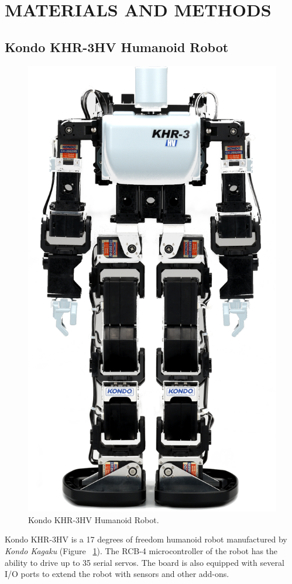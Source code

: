 \documentclass[12pt]{article}
\newcommand\mysection[1]{\vspace*{-0.35cm}\section{#1}\vspace*{6pt}\thispagestyle{empty}}
\newcommand\mysubsection[1]{\subsection{#1}}
\numberwithin{equation}{section}
\numberwithin{figure}{section}
\numberwithin{table}{section}
\begin{document}
\clearpage
\vspace*{-0.35cm}
\mysection{MATERIALS AND METHODS}\label{seq:mat_met}

\mysubsection{Kondo KHR-3HV Humanoid Robot}\label{seq:kondo}
\par{
    \begin{figure}[ht]
        \centering
        \includegraphics[scale=0.7]{images/kondo}
        \caption{Kondo KHR-3HV Humanoid Robot.}
        \label{fig:kondo}
    \end{figure}
    Kondo KHR-3HV is a 17 degrees of freedom humanoid robot manufactured by
    \emph{Kondo Kagaku} (Figure ~\ref{fig:kondo}). The RCB-4 microcontroller of the robot has the
    ability to drive up to 35 serial servos. The board is also equipped with
    several I/O ports to extend the robot with sensors and other add-ons.
}
\end{document}
